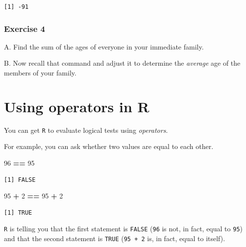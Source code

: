 \documentclass[
]{book}
\newenvironment{Shaded}{\begin{snugshade}}{\end{snugshade}}
\newcommand{\DecValTok}[1]{\textcolor[rgb]{0.00,0.00,0.81}{#1}}
\newcommand{\OperatorTok}[1]{\textcolor[rgb]{0.81,0.36,0.00}{\textbf{#1}}}
\newcommand{\StringTok}[1]{\textcolor[rgb]{0.31,0.60,0.02}{#1}}
\begin{document}
\begin{verbatim}
[1] -91
\end{verbatim}

\hypertarget{exercise-4}{%
\subsubsection*{Exercise 4}\label{exercise-4}}

A. Find the sum of the ages of everyone in your immediate family.

B. Now recall that command and adjust it to determine the \emph{average} age of the members of your family.

\hypertarget{using-operators-in-r}{%
\section*{Using operators in R}\label{using-operators-in-r}}

You can get \texttt{R} to evaluate logical tests using \emph{operators}.

For example, you can ask whether two values are equal to each other.

\begin{Shaded}
\begin{Highlighting}[]
\DecValTok{96} \OperatorTok{==}\StringTok{ }\DecValTok{95}
\end{Highlighting}
\end{Shaded}

\begin{verbatim}
[1] FALSE
\end{verbatim}

\begin{Shaded}
\begin{Highlighting}[]
\DecValTok{95} \OperatorTok{+}\StringTok{ }\DecValTok{2} \OperatorTok{==}\StringTok{ }\DecValTok{95} \OperatorTok{+}\StringTok{ }\DecValTok{2}
\end{Highlighting}
\end{Shaded}

\begin{verbatim}
[1] TRUE
\end{verbatim}

\texttt{R} is telling you that the first statement is \texttt{FALSE} (\texttt{96} is not, in fact, equal to \texttt{95}) and that the second statement is \texttt{TRUE} (\texttt{95\ +\ 2} is, in fact, equal to itself).
\end{document}
